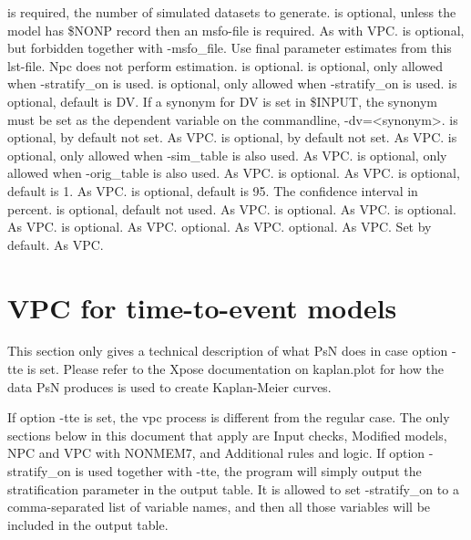 \begin{optionlist}
is required, the number of simulated datasets to generate. 
\nextopt
{}
is optional, unless the model has \$NONP record then an msfo-file 	is required. As with VPC. 
\nextopt
{}
is optional, but forbidden together with -msfo\_file. Use final parameter estimates from this lst-file. Npc does not perform estimation. 
\nextopt
{}
is optional.  
\nextopt
{}
is optional, only allowed when -stratify\_on is used. 
\nextopt
{}
is optional, only allowed when -stratify\_on is used. 
\nextopt
{}
is optional, default is DV. If a synonym for DV is set in \$INPUT, the synonym must be set as the dependent variable on the commandline, -dv=<synonym>. 
\nextopt
{}
is optional, by default not set. As VPC. 
\nextopt
{}
is optional, by default not set. As VPC. 
\nextopt
{}
is optional, only allowed when -sim\_table is also used. As VPC. 
\nextopt
{}
is optional, only allowed when -orig\_table is also used. As VPC. 
is optional. As VPC. 
\nextopt
{}
is optional, default is 1. As VPC. 
\nextopt
{}
is optional, default is 95. The confidence interval in percent. 
\nextopt
{}
is optional, default not used. As VPC. 
\nextopt
{}
is optional. As VPC.    
\nextopt
{}
is optional. As VPC. 
\nextopt
{}
is optional. As VPC.    
\nextopt
{}
optional. As VPC. 
\nextopt
{}
optional. As VPC. 
\nextopt
{}
Set by default. As VPC. 
\nextopt
\end{optionlist}


\section {VPC for time-to-event models}
This section only gives a technical description of what PsN does in case option -tte is set. Please refer to the Xpose documentation on kaplan.plot for how the data PsN produces is used to create Kaplan-Meier curves.

If option -tte is set, the vpc process is different from the regular case. The only sections below in this document that apply are Input checks, Modified models, NPC and VPC with NONMEM7, and Additional rules and logic. If option -stratify\_on is used together with -tte, the program will simply output the stratification parameter in the output table. It is allowed to set -stratify\_on to a comma-separated list of variable names, and then all those variables will be included in the output table.  

